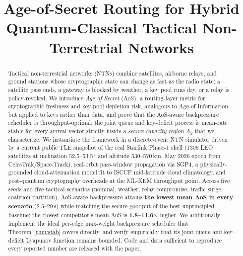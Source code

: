 \documentclass[conference]{IEEEtran}
\begin{document}
\title{Age-of-Secret Routing for Hybrid Quantum-Classical Tactical
       Non-Terrestrial Networks}

\author{
}

\maketitle

\begin{abstract}
Tactical non-terrestrial networks (NTNs) combine satellites, airborne
relays, and ground stations whose cryptographic state can change as
fast as the radio state: a satellite pass ends, a gateway is blocked
by weather, a key pool runs dry, or a relay is policy-revoked.  We
introduce \emph{Age of Secret} (AoS), a routing-layer metric for
cryptographic freshness and key-pool depletion risk, analogous to
Age-of-Information but applied to keys rather than data, and prove
that the AoS-aware backpressure scheduler is throughput-optimal: the
joint queue and key-deficit process is mean-rate stable for every
arrival vector strictly inside a \emph{secure capacity region}
$\Lambda_S$ that we characterize.  We instantiate the framework in a
discrete-event NTN simulator driven by a current public TLE snapshot
of the real Starlink Phase-1 shell (1306 LEO satellites at
inclination 52.5--53.5\,$^\circ$ and altitude 530--570\,km, May 2026
epoch from CelesTrak/Space-Track), real-orbit pass-window propagation
via SGP4, a physically-grounded cloud-attenuation model fit to ISCCP
mid-latitude cloud climatology, and post-quantum cryptography
overheads at the ML-KEM throughput point.  Across five
seeds and five tactical scenarios (nominal, weather, relay
compromise, traffic surge, coalition partition), AoS-aware
backpressure attains \textbf{the lowest mean AoS in every scenario}
(2.5--29\,s) while matching the secure goodput of the best
unprincipled baseline; the closest competitor's mean AoS is
\textbf{1.8--11.6$\times$} higher.  We additionally implement the
ideal per-edge max-weight backpressure scheduler that
Theorem~\ref{thm:stab} covers directly, and verify empirically that
its joint queue and key-deficit Lyapunov function remains bounded.
Code and data sufficient to reproduce every reported number are
released with the paper.
\end{abstract}
\end{document}
